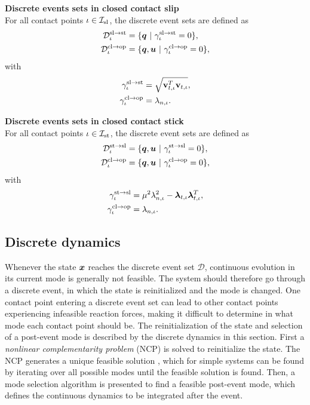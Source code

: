 \documentclass[../DC2017114Bouma.tex]{subfiles}
\begin{document}
\textbf{Discrete events sets in closed contact slip}\\
For all contact points $\iota\in\mathcal{I}_{\text{sl}}$, the discrete event sets are defined as
\begin{align}
\mathcal{D}^{\text{sl}\rightarrow\text{st}}_{\iota} &= \{ \qb\ |\ \gamma^{\text{sl}\rightarrow\text{st}}_{\iota} = 0\},\label{eq:2Dslst}\\
\mathcal{D}^{\text{cl}\rightarrow\text{op}}_{\iota} &= \{ \qb,\ub\ |\ \gamma^{\text{cl}\rightarrow\text{op}}_{\iota} = 0\},\label{eq:2Dslop}
\end{align}
with 
\begin{align}
\gamma^{\text{sl}\rightarrow\text{st}}_{\iota} &= \sqrt{\mathbf{v}_{t,\iota}^T\mathbf{v}_{t,\iota}},\\
\gamma^{\text{cl}\rightarrow\text{op}}_{\iota} &= \lambda_{n,\iota}.
\end{align}

\textbf{Discrete events sets in closed contact stick}\\
For all contact points $\iota\in\mathcal{I}_{\text{st}}$, the discrete event sets are defined as
\begin{align}
\mathcal{D}^{\text{st}\rightarrow\text{sl}}_{\iota} &= \{ \qb,\ub\ |\ \gamma^{\text{st}\rightarrow\text{sl}}_{\iota} = 0 \},\label{eq:2Dstsl}\\
\mathcal{D}^{\text{cl}\rightarrow\text{op}}_{\iota} &= \{ \qb,\ub\ |\ \gamma^{\text{cl}\rightarrow\text{op}}_{\iota} = 0 \},\label{eq:2Dstop}
\end{align}
with 
\begin{align}
\gamma^{\text{st}\rightarrow\text{sl}}_{\iota} &= \mu^2\lambda_{n,\iota}^2-\boldsymbol{\lambda}_{t,\iota}\boldsymbol{\lambda}_{t,\iota}^T,\\
\gamma^{\text{cl}\rightarrow\text{op}}_{\iota} &= \lambda_{n,\iota}.
\end{align}

\subsection{Discrete dynamics}\label{sec:2discdyn}
Whenever the state ${\boldsymbol{x}}$ reaches the discrete event set $\mathcal{D}$, continuous evolution in its current mode is generally not feasible. The system should therefore go through a discrete event, in which the state is reinitialized and the mode is changed. One contact point entering a discrete event set can lead to other contact points experiencing infeasible reaction forces, making it difficult to determine in what mode each contact point should be. The reinitialization of the state and selection of a post-event mode is described by the discrete dynamics in this section. First a \textit{nonlinear complementarity problem} (NCP) is solved to reinitialize the state. The NCP generates a unique feasible solution \cite{Delassus1917}, which for simple systems can be found by iterating over all possible modes until the feasible solution is found. Then, a mode selection algorithm is presented to find a feasible post-event mode, which defines the continuous dynamics to be integrated after the event. 
%
\end{document}
